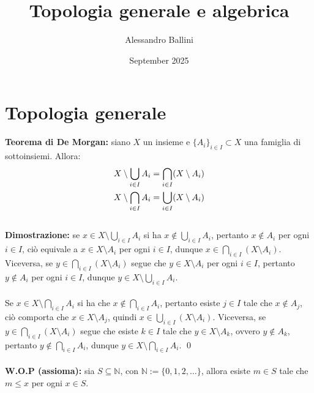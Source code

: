 \documentclass{article}
\title{Topologia generale e algebrica}
\author{Alessandro Ballini}
\date{September 2025}
\begin{document}
\maketitle
\tableofcontents
\newpage
\section{Topologia generale}
\textbf{Teorema di De Morgan:} siano $X$ un insieme e $\{ A_i \}_{i \in I} \subset X$ una famiglia di sottoinsiemi. Allora:
\begin{gather}
    X \setminus \bigcup_{i \in I} A_i = \bigcap_{i \in I} (X \setminus A_i) \notag \\
    X \setminus \bigcap_{i \in I} A_i = \bigcup_{i \in I} (X \setminus A_i) \notag
\end{gather} \\

\textbf{Dimostrazione:} se $x \in X \setminus \bigcup_{i \in I} A_i$ si ha $x \not\in \bigcup_{i \in I} A_i$, pertanto $x \not\in A_i$ per ogni $i \in I$, ciò equivale a $x \in X \setminus A_i$ per ogni $i \in I$, dunque $x \in \bigcap_{i \in I} (X \setminus A_i)$. Viceversa, se $y \in \bigcap_{i \in I} (X \setminus A_i)$ segue che $y \in X \setminus A_i$ per ogni $i \in I$, pertanto $y \not\in A_i$ per ogni $i \in I$, dunque $y \in X \setminus \bigcup_{i \in I} A_i$. \\ \\
Se $x \in X \setminus \bigcap_{i \in I} A_i$ si ha che $x \not\in \bigcap_{i \in I} A_i$, pertanto esiste $j \in I$ tale che $x \not\in A_j$, ciò comporta che $x \in X \setminus A_j$, quindi $x \in \bigcup_{i \in I} (X \setminus A_i)$. Viceversa, se $y \in \bigcap_{i \in I} (X \setminus A_i)$ segue che esiste $k \in I$ tale che $y \in X \setminus A_k$, ovvero $y \not\in A_k$, pertanto $y \not\in \bigcap_{i \in I} A_i$, dunque $y \in X \setminus \bigcap_{i \in I} A_i$. \qed \\ \\
\textbf{W.O.P (assioma):} sia $S \subseteq \mathbb{N}$, con $\mathbb{N} := \{0, 1, 2, \dots\}$, allora esiste $m \in S$ tale che $m \leq x$ per ogni $x \in S$.
\end{document}
